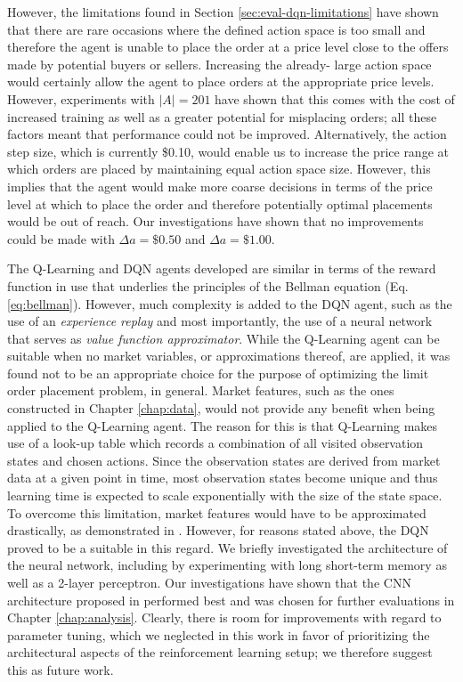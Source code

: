     However, the limitations found in Section \ref{sec:eval-dqn-limitations} have shown that there are rare occasions where the defined action space is too small and therefore the agent is unable to place the order at a price level close to the offers made by potential buyers or sellers.
    Increasing the already- large action space would certainly allow the agent to place orders at the appropriate price levels.
    However, experiments with $|A|=201$ have shown that this comes with the cost of increased training as well as a greater potential for misplacing orders; all these factors meant that performance could not be improved.
    Alternatively, the action step size, which is currently \$0.10, would enable us to increase the price range at which orders are placed by maintaining equal action space size.
    However, this implies that the agent would make more coarse decisions in terms of the price level at which to place the order and therefore potentially optimal placements would be out of reach.
    Our investigations have shown that no improvements could be made with $\Delta{a}=\$0.50$ and $\Delta{a}=\$1.00$.

    The Q-Learning and DQN agents developed are similar in terms of the reward function in use that underlies the principles of the Bellman equation (Eq. \ref{eq:bellman}).
    However, much complexity is added to the DQN agent, such as the use of an \textit{experience replay} and most importantly, the use of a neural network that serves as \textit{value function approximator}.
    While the Q-Learning agent can be suitable when no market variables, or approximations thereof, are applied, it was found not to be an appropriate choice for the purpose of optimizing the limit order placement problem, in general.
    Market features, such as the ones constructed in Chapter \ref{chap:data}, would not provide any benefit when being applied to the Q-Learning agent.
    The reason for this is that Q-Learning makes use of a look-up table which records a combination of all visited observation states and chosen actions.
    Since the observation states are derived from market data at a given point in time, most observation states become unique and thus learning time is expected to scale exponentially with the size of the state space\cite{whitehead1991complexity}.
    To overcome this limitation, market features would have to be approximated drastically, as demonstrated in \cite{nevmyvaka2006reinforcement}.
    However, for reasons stated above, the DQN proved to be a suitable in this regard.
    We briefly investigated the architecture of the neural network, including by experimenting with long short-term memory\cite{gers1999learning} as well as a 2-layer perceptron.
    Our investigations have shown that the CNN architecture proposed in \cite{mnih2015human} performed best and was chosen for further evaluations in Chapter \ref{chap:analysis}.
    Clearly, there is room for improvements with regard to parameter tuning, which we neglected in this work in favor of prioritizing the architectural aspects of the reinforcement learning setup; we  therefore suggest this as future work.

